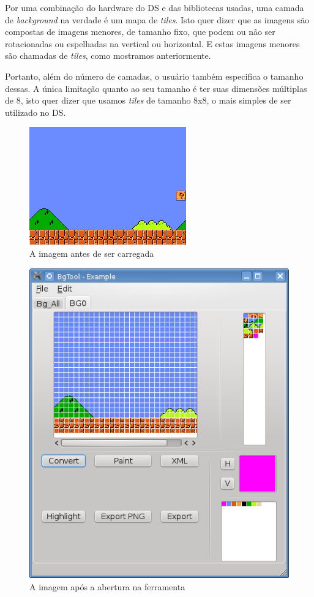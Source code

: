 \documentclass[brazil]{abnt}
\begin{document}

Por uma combinação do hardware do DS e das bibliotecas usadas, uma camada de \textit{background} na verdade é um mapa de \textit{tiles}. Isto quer dizer que as imagens são compostas de imagens menores, de tamanho fixo, que podem ou não ser rotacionadas ou espelhadas na vertical ou horizontal. E estas imagens menores são chamadas de \textit{tiles}, como mostramos anteriormente.

Portanto, além do número de camadas, o usuário também especifica o tamanho dessas. A única limitação quanto ao seu tamanho é ter suas dimensões múltiplas de 8, isto quer dizer que usamos \textit{tiles} de tamanho 8x8, o mais simples de ser utilizado no DS.

\begin{figure}[h!]
\centering
\includegraphics[scale=1]{imgs/exemplo.png}
\caption{A imagem antes de ser carregada} 
\end{figure}

\begin{figure}[h!]
\centering
\includegraphics[scale=1]{imgs/bgtool1.png}
\caption{A imagem após a abertura na ferramenta} 
\end{figure}
\end{document}
